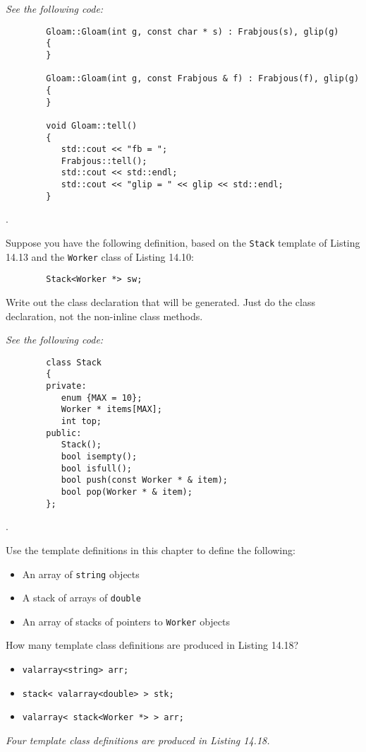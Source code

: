 \documentclass{amsart}
\begin{document}
\vfill

\phantom{3. } 
\begin{minipage}[t]{11.5 cm}
	{\slshape 
		See the following code:
	}
	\begin{verbatim}
		Gloam::Gloam(int g, const char * s) : Frabjous(s), glip(g)
		{
		}

		Gloam::Gloam(int g, const Frabjous & f) : Frabjous(f), glip(g)
		{
		}

		void Gloam::tell()
		{
		   std::cout << "fb = ";
		   Frabjous::tell();
		   std::cout << std::endl;
		   std::cout << "glip = " << glip << std::endl;
		}
	\end{verbatim} 
\end{minipage} 
\vfill
\newpage

\phantom{\quad}
\vfill
{}. 
\begin{minipage}[t]{11.5 cm}
	Suppose you have the following definition, based on the \texttt{Stack} template of Listing 14.13 and the \texttt{Worker} class of Listing 14.10:
	\begin{verbatim}
		Stack<Worker *> sw;
	\end{verbatim}
Write out the class declaration that will be generated. Just do the class declaration, not the non-inline class methods.
\end{minipage}
\vfill
\phantom{2. } 
\begin{minipage}[t]{11.5 cm}
	{\slshape 
		See the following code:
	} 
	\begin{verbatim}
		class Stack
		{
		private:
		   enum {MAX = 10}; 
		   Worker * items[MAX];
		   int top;
		public:
		   Stack();
		   bool isempty();
		   bool isfull();
		   bool push(const Worker * & item);
		   bool pop(Worker * & item);
		};
	\end{verbatim}
\end{minipage} 
\vfill

. 
\begin{minipage}[t]{11.5 cm}
	Use the template definitions in this chapter to define the following:
	\begin{itemize}
		\item An array of \texttt{string} objects
		\item A stack of arrays of \texttt{double}
		\item An array of stacks of pointers to \texttt{Worker} objects
	\end{itemize}
	How many template class definitions are produced in Listing 14.18?
\end{minipage}
\vfill
\phantom{3. } 
\begin{minipage}[t]{11.5 cm}
	\begin{itemize}
		\item
		   \verb+valarray<string> arr;+
		\item
		   \verb+stack< valarray<double> > stk;+
		\item
		   \verb+valarray< stack<Worker *> > arr;+
	\end{itemize}
	{\slshape
		Four template class definitions are produced in Listing 14.18.
	}
\end{minipage} 
\vfill
\end{document}
